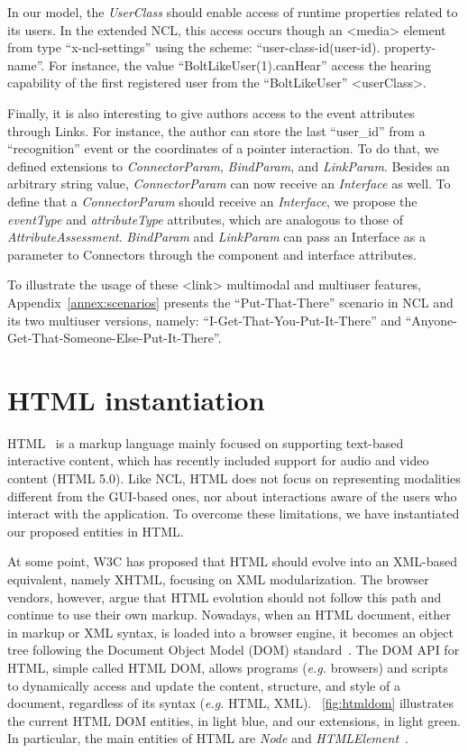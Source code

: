 \documentclass[
  doutorado,
  american
]{ThesisPUC}
\newcommand{\fig}[1]{\figurename~\ref{#1}}
\newcommand{\appen}[1]{Appendix~\ref{#1}}
\begin{document}
In our model, the \textit{UserClass} should enable access of runtime properties
related to its users. In the extended NCL, this access occurs though an <media>
element from type “x-ncl-settings” using the scheme: “user-class-id(user-id).
property-name”. For instance, the value “BoltLikeUser(1).canHear” access the
hearing capability of the first registered user from the “BoltLikeUser”
<userClass>.

Finally, it is also interesting to give authors access to the event attributes
through Links. For instance, the author can store the last “user\_id” from a
“recognition” event or the coordinates of a pointer interaction. To do that, we
defined extensions to \textit{ConnectorParam}, \textit{BindParam}, and 
\textit{LinkParam}. Besides an arbitrary string value, \textit{ConnectorParam}
can now receive an 
\textit{Interface} as well. To define that a \textit{ConnectorParam} should
receive an \textit{Interface}, we propose the 
\textit{eventType} and \textit{attributeType} attributes, which are analogous to
those of 
\textit{AttributeAssessment}. \textit{BindParam} and \textit{LinkParam} can pass
an Interface as a parameter to Connectors through the component and interface
attributes.

To illustrate the usage of these <link> multimodal and multiuser features,
\appen{annex:scenarios} presents the “Put-That-There” scenario in NCL and its two multiuser versions, namely: “I-Get-That-You-Put-It-There” and 
“Anyone-Get-That-Someone-Else-Put-It-There”.


\section{HTML instantiation}
\label{sec:html}

HTML~\cite{w3c_html_2014} is a markup language mainly focused on supporting
text-based interactive content, which has recently included support for audio
and video content (HTML 5.0). Like NCL, HTML does not focus on representing
modalities different from the GUI-based ones, nor about interactions aware of
the users who interact with the application. To overcome these limitations, we
have instantiated our proposed entities in HTML.

At some point, W3C has proposed that HTML should evolve into an XML-based
equivalent, namely XHTML, focusing on XML modularization. The browser vendors,
however, argue that HTML evolution should not follow this path and continue to
use their own markup\footnotemark. Nowadays, when an HTML document, either in 
markup or XML syntax, is loaded into a browser engine, it becomes an object 
tree following the Document Object Model (DOM) standard~\cite{w3c_dom4_2015}. 
The DOM API for HTML, simple called HTML DOM\footnotemark, allows programs 
(\textit{e.g.} browsers) and scripts to dynamically access and update the 
content, structure, and style of a document, regardless of its syntax 
(\textit{e.g.} HTML, XML). \fig{fig:htmldom} illustrates the current HTML DOM 
entities\footnotemark, in light blue, and our extensions, in light green. In 
particular, the main entities of HTML are \textit{Node} and 
\textit{HTMLElement}~\cite{mozilla_dom}. 
\end{document}
